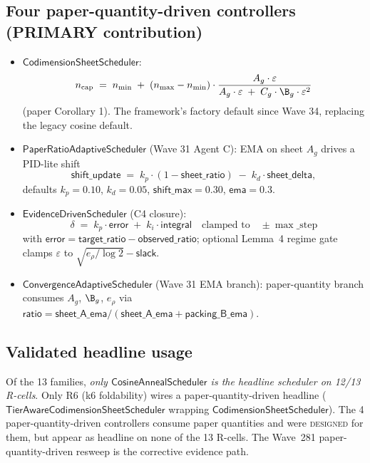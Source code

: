 \documentclass[journal,twocolumn,final]{IEEEtran}
\newcommand{\egap}{e_\rho}
\newcommand{\sheetA}{A_g}
\newcommand{\sheetC}{C_g}
\begin{document}
\subsection{Four paper-quantity-driven controllers (PRIMARY contribution)}

\begin{itemize}
\item $\mathsf{CodimensionSheetScheduler}$:
\begin{equation}\label{eq:codim}
n_\mathrm{cap} \;=\; n_\mathrm{min} \;+\; (n_\mathrm{max} - n_\mathrm{min})
\cdot \frac{\sheetA \cdot \varepsilon}{\sheetA \cdot \varepsilon \;+\;
\sheetC \cdot \B_g \cdot \varepsilon^2}
\end{equation}
(paper Corollary 1). The framework's factory default since Wave 34, replacing
the legacy cosine default.

\item $\mathsf{PaperRatioAdaptiveScheduler}$ (Wave 31 Agent C): EMA on sheet
$\sheetA$ drives a PID-lite shift
\begin{equation}\label{eq:shift}
\mathsf{shift\_update} \;=\; k_p \cdot (1 - \mathsf{sheet\_ratio}) \;-\;
k_d \cdot \mathsf{sheet\_delta},
\end{equation}
defaults $k_p = 0.10$, $k_d = 0.05$, $\mathsf{shift\_max} = 0.30$, $\mathsf{ema}
= 0.3$.

\item $\mathsf{EvidenceDrivenScheduler}$ (C4 closure):
\begin{equation}\label{eq:eds}
\delta \;=\; k_p \cdot \mathsf{error} \;+\; k_i \cdot \mathsf{integral}
\quad\text{clamped to}\quad \pm\max\_\mathrm{step}
\end{equation}
with $\mathsf{error} = \mathsf{target\_ratio} - \mathsf{observed\_ratio}$;
optional Lemma~4 regime gate clamps $\varepsilon$ to
$\sqrt{\egap / \log 2} - \mathsf{slack}$.

\item $\mathsf{ConvergenceAdaptiveScheduler}$ (Wave 31 EMA branch): paper-quantity
branch consumes $\sheetA$, $\B_g$, $\egap$ via
$\mathsf{ratio} = \mathsf{sheet\_A\_ema} / (\mathsf{sheet\_A\_ema} +
\mathsf{packing\_B\_ema})$.
\end{itemize}

\subsection{Validated headline usage}

Of the 13 families, \emph{only $\mathsf{CosineAnnealScheduler}$ is the headline
scheduler on 12/13 R-cells}. Only R6 (k6 foldability) wires a
paper-quantity-driven headline ($\mathsf{TierAwareCodimensionSheetScheduler}$
wrapping $\mathsf{CodimensionSheetScheduler}$). The 4 paper-quantity-driven
controllers consume paper quantities and were \textsc{designed} for them, but
appear as headline on none of the 13 R-cells. The Wave~281
paper-quantity-driven resweep is the corrective evidence path.
\end{document}
